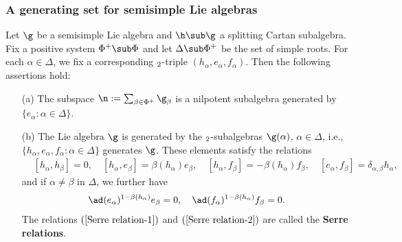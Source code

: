 \subsubsection{A generating set for semisimple Lie algebras}
\begin{proposition}\label{Lie semisimple algebra Serre relation}
Let $\g$ be a semisimple Lie algebra and $\h\sub\g$ a splitting Cartan subalgebra. Fix a positive system $\Phi^+\sub\Phi$ and let $\Delta\sub\Phi^+$ be the set of simple roots. For each $\alpha\in\Delta$, we fix a corresponding $\sl_2$-triple $(h_\alpha,e_\alpha,f_\alpha)$. Then the following assertions hold:
\begin{itemize}
\item[(a)] The subspace $\n:=\sum_{\beta\in\Phi^+}\g_\beta$ is a nilpotent subalgebra generated by $\{e_\alpha:\alpha\in\Delta\}$.
\item[(b)] The Lie algebra $\g$ is generated by the $\sl_2$-subalgebras $\g(\alpha)$, $\alpha\in\Delta$, i.e., $\{h_\alpha,e_\alpha,f_\alpha:\alpha\in\Delta\}$ generates $\g$. These elements satisfy the relations
\begin{equation}\label{Serre relation-1}
\begin{aligned}
&[h_\alpha,h_\beta]=0,\quad [h_\alpha,e_\beta]=\beta(h_\alpha)e_\beta,\quad[h_\alpha,f_\beta]=-\beta(h_\alpha)f_\beta,\quad [e_\alpha,f_\beta]=\delta_{\alpha,\beta}h_\alpha,
\end{aligned}
\end{equation}
and if $\alpha\neq\beta$ in $\Delta$, we further have
\begin{align}\label{Serre relation-2}
\ad(e_\alpha)^{1-\beta(h_\alpha)}e_\beta=0,\quad \ad(f_\alpha)^{1-\beta(h_\alpha)}f_\beta=0.
\end{align}
The relations $(\ref{Serre relation-1})$ and $(\ref{Serre relation-2})$ are called the \textbf{Serre relations}.
\end{itemize}
\end{proposition}
